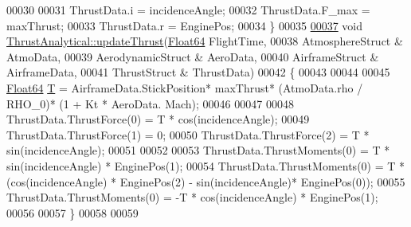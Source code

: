 \begin{DoxyCode}
00030 
00031     ThrustData.i = incidenceAngle;
00032     ThrustData.F\_max = maxThrust;
00033     ThrustData.r = EnginePos;
00034 \}
00035 
\hyperlink{group___engine_a3907d6febaf711a225c0abfe8022304f}{00037} \textcolor{keywordtype}{void} \hyperlink{group___engine_a3907d6febaf711a225c0abfe8022304f}{ThrustAnalytical::updateThrust}(\hyperlink{group___tools_ga3f1431cb9f76da10f59246d1d743dc2c}{Float64} FlightTime,
00038                                   AtmosphereStruct & AtmoData,
00039                                   AerodynamicStruct & AeroData,
00040                                   AirframeStruct & AirframeData,
00041                                   ThrustStruct & ThrustData)
00042 \{
00043 
00044                                                   
00045     \hyperlink{group___tools_ga3f1431cb9f76da10f59246d1d743dc2c}{Float64}  \hyperlink{group___sparse_core___module}{T} = AirframeData.StickPosition* maxThrust* (AtmoData.rho / RHO\_0)* (1 + Kt * AeroData.
      Mach);
00046 
00047     
00048         ThrustData.ThrustForce(0) = T * cos(incidenceAngle);
00049         ThrustData.ThrustForce(1) = 0;
00050         ThrustData.ThrustForce(2) = T * sin(incidenceAngle);
00051 
00052     
00053         ThrustData.ThrustMoments(0) = T * sin(incidenceAngle) * EnginePos(1);
00054         ThrustData.ThrustMoments(0) = T * (cos(incidenceAngle) * EnginePos(2) - sin(incidenceAngle)*
      EnginePos(0));
00055         ThrustData.ThrustMoments(0) = -T * cos(incidenceAngle) * EnginePos(1);
00056 
00057 \}
00058 
00059 
\end{DoxyCode}
